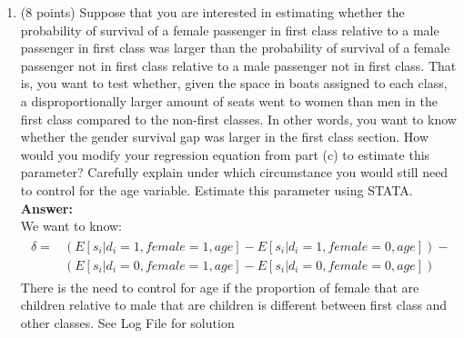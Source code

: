 \documentclass[letterpaper,12pt]{article}
\begin{document}
\begin{enumerate}[label=(\alph*)]
\item (8 points) Suppose that you are interested in estimating whether the probability of survival of a female passenger in first class relative to a male passenger in first class was larger than the probability of survival of a female passenger not in first class relative to a male passenger not in first class. That is, you want to test whether, given the space in boats assigned to each class, a disproportionally larger amount of seats went to women than men in the first class compared to the non-first classes. In other words, you want to know whether the gender survival gap was larger in the first class section. How would you modify your regression equation from part (c) to estimate this parameter? Carefully explain under which circumstance you would still need to control for the age variable. Estimate this parameter using STATA. \\
\textbf{Answer:} \\
We want to know:
\begin{eqnarray*}
\begin{array}{ll}
\delta=&\left(E[s_i|d_i=1,female=1, age]-E[s_i|d_i=1,female=0, age]\right)- \\
		  &\left(E[s_i|d_i=0,female=1, age]-E[s_i|d_i=0,female=0, age]\right)    
\end{array}
\end{eqnarray*}
There is the need to control for age if the proportion of female that are children relative to male that are children is different between first class and other classes. See Log File for solution
\end{enumerate}
\end{document}
